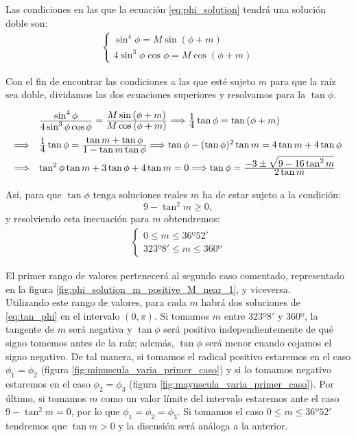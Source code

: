 \documentclass[11pt]{article}
\newcommand\ddfrac[2]{\frac{\displaystyle #1}{\displaystyle #2}}
\begin{document}
Las condiciones en las que la ecuación \eqref{eq:phi_solution} tendrá una solución doble son:
\begin{align}
\left\{
\begin{array}{l}
	\sin^4{\phi}=M\sin{(\phi+m)}\\
	4\sin^3{\phi}\cos{\phi}=M\cos{(\phi+m)}
\end{array}
\right.
\label{eq:condicion_raiz_doble}
\end{align}

Con el fin de encontrar las condiciones a las que esté sujeto $m$ para que la raíz sea doble, dividamos las dos ecuaciones superiores y resolvamos para la $\tan{\phi}$.
\begin{align}
\def\arraystretch{2}
\begin{array}{ll}
  & \ddfrac{\sin^4{\phi}}{4\sin^3{\phi}\cos{\phi}}=\ddfrac{M\sin{(\phi+m)}}{M\cos{(\phi+m)}}\Longrightarrow \ddfrac{1}{4}\tan{\phi}=\tan{(\phi+m)}\\
\Longrightarrow & \ddfrac{1}{4}\tan{\phi}=\ddfrac{\tan{m}+\tan{\phi}}{1-\tan{m}\tan{\phi}} \Longrightarrow \tan{\phi}-(\tan{\phi})^2\tan{m}=4\tan{m}+4\tan{\phi}\\
\Longrightarrow & \tan^2{\phi}\tan{m}+3\tan{\phi}+4\tan{m}=0 \Longrightarrow \tan{\phi}=\ddfrac{-3\pm\sqrt{9-16\tan^2{m}}}{2\tan{m}}
\end{array}
\label{eq:tan_phi}
\end{align}

Así, para que $\tan{\phi}$ tenga soluciones reales $m$ ha de estar sujeto a la condición:
\[
9-\tan^2{m}\geq0,
\]
\noindent y resolviendo esta inecuación para $m$ obtendremos:
\begin{align}
\left\{
\begin{array}{l}
	0 \leq m \leq 36º52'\\
	323º8' \leq m \leq 360º
\end{array}
\right.
\label{eq:m_condition}
\end{align}

El primer rango de valores pertenecerá al segundo caso comentado, representado en la figura \ref{fig:phi_solution_m_positive_M_near_1}, y viceversa.\\

Utilizando este rango de valores, para cada $m$ habrá dos soluciones de \eqref{eq:tan_phi} en el intervalo $(0,\pi)$. Si tomamos $m$ entre $323º8'$ y $360º$, la tangente de $m$ será negativa y $\tan{\phi}$ será positiva independientemente de qué signo tomemos antes de la raíz; además, $\tan{\phi}$ será menor cuando cojamos el signo negativo. De tal manera, si tomamos el radical positivo estaremos en el caso $\phi_1=\phi_2$ (figura \ref{fig:minuscula_varia_primer_caso}) y si lo tomamos negativo estaremos en el caso $\phi_2=\phi_3$ (figura \ref{fig:mayuscula_varia_primer_caso}). Por último, si tomamos $m$ como un valor límite del intervalo estaremos ante el caso $9-\tan^2{m}=0$, por lo que $\phi_1=\phi_2=\phi_3$. Si tomamos el caso $0 \leq m \leq 36º52'$ tendremos que $\tan{m}>0$ y la discusión será análoga a la anterior.\\
\end{document}
